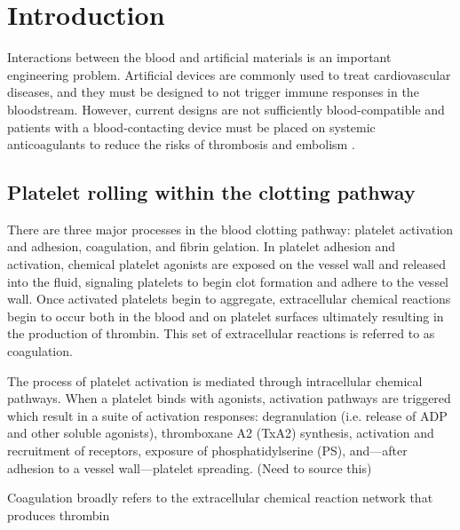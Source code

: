 
\chapter{Introduction}
\label{cha:introduction}


Interactions between the blood and artificial materials is an
important engineering problem. Artificial devices are commonly used to
treat cardiovascular diseases, and they must be designed to not
trigger immune responses in the bloodstream. However, current designs
are not sufficiently blood-compatible and patients with a
blood-contacting device must be placed on systemic anticoagulants to
reduce the risks of thrombosis and embolism
\cite{Ratner1993,Ratner2007,Oprea13}. 
	

\section{Platelet rolling within the clotting pathway}
\label{sec:plat-roll-with}

There are three major processes in the blood clotting pathway:
platelet activation and adhesion, coagulation, and fibrin
gelation. In platelet adhesion and activation, chemical platelet
agonists are exposed on the vessel wall and released into the fluid,
signaling platelets to begin clot formation and adhere to the vessel
wall. Once activated platelets begin to aggregate, extracellular
chemical reactions begin to occur both in the blood and on platelet
surfaces ultimately resulting in the production of thrombin. This set
of extracellular reactions is referred to as coagulation.

The process of platelet activation is mediated through
intracellular chemical pathways. When a platelet binds with agonists,
activation pathways are triggered which result in a suite of
activation responses: degranulation (i.e. release of ADP and other
soluble agonists), thromboxane A2 (TxA2) synthesis, activation and
recruitment of  receptors, exposure of
phosphatidylserine (PS), and---after adhesion to a vessel
wall---platelet spreading. (Need to source this)

Coagulation broadly refers to the extracellular chemical reaction
network that produces thrombin


